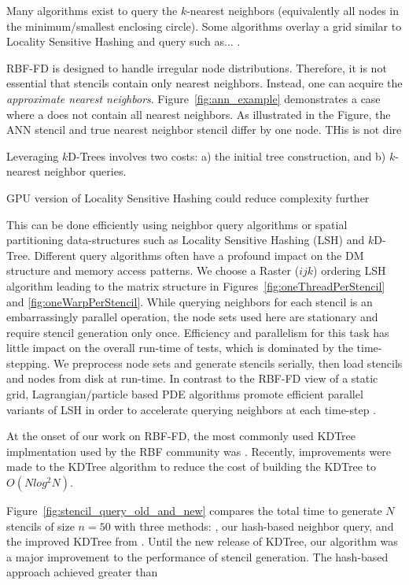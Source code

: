 \documentclass[11pt]{report}
\begin{document}
{Many algorithms exist to query the $k$-nearest neighbors (equivalently all nodes in the minimum/smallest enclosing circle). Some algorithms overlay a grid similar to Locality Sensitive Hashing and query such as... \cite{HarPeledMazumdar2003}.

RBF-FD is designed to handle irregular node distributions. Therefore, it is not essential that stencils contain only nearest neighbors. Instead, one can acquire the \emph{approximate nearest neighbors}. Figure~\ref{fig:ann_example} demonstrates a case where a does not contain all nearest neighbors. As illustrated in the Figure, the ANN stencil and true nearest neighbor stencil differ by one node. THis is not dire



Leveraging $k$D-Trees involves two costs: a) the initial tree construction, and b) $k$-nearest neighbor queries. 

GPU version of Locality Sensitive Hashing could reduce complexity further \cite{Pan2011}

This can be done efficiently using neighbor query algorithms or spatial partitioning data-structures such as Locality Sensitive Hashing (LSH) and $k$D-Tree. Different query algorithms often have a profound impact on the DM structure and memory access patterns. We choose a Raster ($ijk$) ordering LSH algorithm \cite{Bollig2011} leading to the matrix structure in Figures~\ref{fig:oneThreadPerStencil} and \ref{fig:oneWarpPerStencil}. While querying neighbors for each stencil is an embarrassingly parallel operation, the node sets used here are stationary and require stencil generation only once. Efficiency and parallelism for this task has little impact on the overall run-time of tests, which is dominated by the time-stepping. We preprocess node sets and generate stencils serially, then load stencils and nodes from disk at run-time. In contrast to the RBF-FD view of a static grid, Lagrangian/particle based PDE algorithms promote efficient parallel variants of LSH in order to accelerate querying neighbors at each time-step \cite{Pan2011, Goswami2010}. 


At the onset of our work on RBF-FD, the most commonly used KDTree implmentation used by the RBF community was \cite{Tagliasacchi2008}. Recently, improvements were made to the KDTree algorithm to reduce the cost of building the KDTree to $O(N log^2 N)$. 

Figure~\ref{fig:stencil_query_old_and_new} compares the total time to generate $N$ stencils of size $n=50$ with three methods: \cite{Tagliasacchi2008}, our hash-based neighbor query, and the improved KDTree from \cite{Tagliasacchi2012}. 
Until the new release of KDTree, our algorithm was a major improvement to the performance of stencil generation. The hash-based approach achieved greater than 


}
\end{document}
